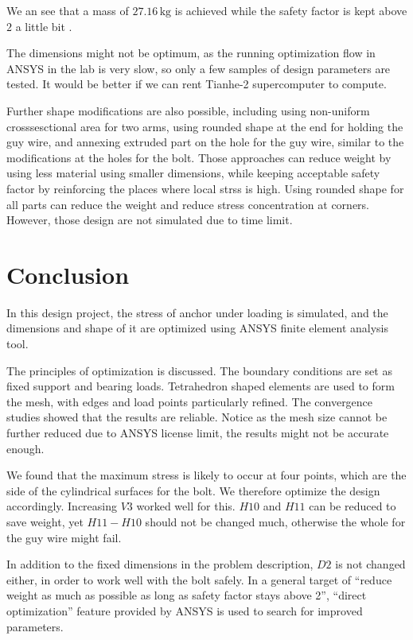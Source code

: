 \documentclass[a4paper,14pt]{extarticle}
\newcommand{\kg}{\,\si{\kilo\gram}}
\begin{document}
We an see that a mass of $27.16\kg$ is achieved while the safety factor is kept above $2$ a little bit .

The dimensions might not be optimum, as the running optimization flow in ANSYS in the lab is very slow, so only a few samples of design parameters are tested. It would be better if we can rent Tianhe-2 supercomputer to compute.

Further shape modifications are also possible, including using non-uniform crosssesctional area for two arms, using rounded shape at the end for holding the guy wire, and annexing extruded part on the hole for the guy wire, similar to the modifications at the holes for the bolt. Those approaches can reduce weight by using less material using smaller dimensions, while keeping acceptable safety factor by reinforcing the places where local strss is high. Using rounded shape for all parts can reduce the weight and reduce stress concentration at corners. However, those design are not simulated due to time limit. 
\section{Conclusion}
In this design project, the stress of anchor under loading is simulated, and the dimensions and shape of it are optimized using ANSYS finite element analysis tool.

The principles of optimization is discussed. The boundary conditions are set as fixed support and bearing loads. Tetrahedron shaped elements are used to form the mesh, with edges and load points particularly refined. The convergence studies showed that the results are reliable. Notice as the mesh size cannot be further reduced due to ANSYS license limit, the results might not be accurate enough.

We found that the maximum stress is likely to occur at four points, which are the side of the cylindrical surfaces for the bolt. We therefore optimize the design accordingly. Increasing $V3$ worked well for this. $H10$ and $H11$ can be reduced to save weight, yet $H11 - H10$ should not be changed much, otherwise the whole for the guy wire might fail.

In addition to the fixed dimensions in the problem description, $D2$ is not changed either, in order to work well with the bolt safely. In a general target of ``reduce weight as much as possible as long as safety factor stays above 2'', ``direct optimization'' feature provided by ANSYS is used to search for improved parameters.
\end{document}
